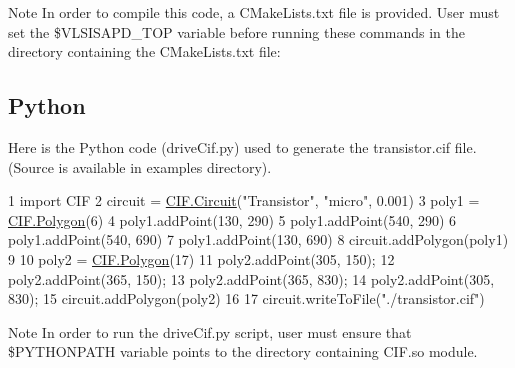 \begin{DoxyNote}{Note}
In order to compile this code, a C\-Make\-Lists.\-txt file is provided. User must set the \$\-V\-L\-S\-I\-S\-A\-P\-D\-\_\-\-T\-O\-P variable before running these commands in the directory containing the C\-Make\-Lists.\-txt file\-: 
\begin{DoxyCode}
\end{DoxyCode}

\end{DoxyNote}
\hypertarget{cif_cifPython}{}\subsection{Python}\label{cif_cifPython}
Here is the Python code ({\ttfamily drive\-Cif.\-py}) used to generate the transistor.\-cif file. (Source is available in examples directory). 
\begin{DoxyCodeInclude}
1 \textcolor{keyword}{import} CIF
2 circuit = \hyperlink{class_c_i_f_1_1_circuit}{CIF.Circuit}(\textcolor{stringliteral}{"Transistor"}, \textcolor{stringliteral}{"micro"}, 0.001)
3 poly1 = \hyperlink{class_c_i_f_1_1_polygon}{CIF.Polygon}(6)
4 poly1.addPoint(130, 290)
5 poly1.addPoint(540, 290)
6 poly1.addPoint(540, 690)
7 poly1.addPoint(130, 690)
8 circuit.addPolygon(poly1)
9     
10 poly2 = \hyperlink{class_c_i_f_1_1_polygon}{CIF.Polygon}(17)
11 poly2.addPoint(305, 150);
12 poly2.addPoint(365, 150);
13 poly2.addPoint(365, 830);
14 poly2.addPoint(305, 830);
15 circuit.addPolygon(poly2)
16 
17 circuit.writeToFile(\textcolor{stringliteral}{"./transistor.cif"})
\end{DoxyCodeInclude}


\begin{DoxyNote}{Note}
In order to run the {\ttfamily drive\-Cif.\-py} script, user must ensure that \$\-P\-Y\-T\-H\-O\-N\-P\-A\-T\-H variable points to the directory containing C\-I\-F.\-so module. 
\end{DoxyNote}
